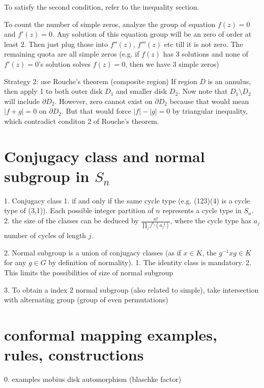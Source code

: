     To satisfy the second condition, refer to the inequality section.
      
	To count the number of simple zeros, analyze the group of equation 
$f(z) = 0$ and $f'(z) = 0$. Any solution of this equation group will be an zero of order at least 2. Then just plug those into $f''(z)$, $f'''(z)$ etc till it is not zero. The remaining quota are all simple zeros (e.g. if $f(z)$ has 3 solutions and none of $f'(z)=0$'s solution solves $f(z)=0$, then we have 3 simple zeros)



Strategy 2: use Rouche's theorem (composite region)   
    If region $D$ is an annulus, then apply 1 to both outer disk $D_1$ and smaller disk $D_2$. Now note that $D_1 \setminus D_2$ will include $\partial D_2$. However, zero cannot exist on $\partial D_2$ because that would mean $|f+g| = 0$ on $\partial D_2$. But that would force $|f| - |g| = 0$ by triangular inequality, which contradict conditon 2 of Rouche's theorem.
    





\section*{Conjugacy class and normal subgroup in $S_n$}

1. Conjugacy class
	1. if and only if the same cycle type (e.g. (123)(4) is a cycle type of (3,1)). Each possible integer partition of $n$ represents a cycle type in $S_n$.
   	2. the size of the classes can be deduced by $\frac{n!}{\prod_j j^{a_j}(a_j!)}$, where the cycle type has $a_j$ number of cycles of length $j$. 
    
        
2. Normal subgroup is a union of conjugacy classes (as if $x \in K$, the $g^{-1}xg \in K$ for any $g \in G$ by definition of normality). 
	1. The identity class is mandatory. 
    2. This limits the possibilities of size of normal subgroup


3. To obtain a index 2 normal subgroup (also related to simple), take intersection with alternating group (group of even permutations)


\section*{conformal mapping examples, rules, constructions}


0. examples 
    mobius
    disk automorphism (blaschke factor)



